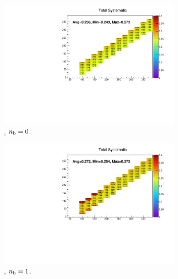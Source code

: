 \begin{figure}[h!]
  \centering
  \begin{subfigure}[b]{0.47\textwidth}
    \includegraphics[width=\textwidth]{Figs/sms/t2degen/v19/systs/total_T2_4body_eq0b_le3j_incl.pdf}
    \caption{\njlow, $n_{\text{b}} = 0$.}
  \end{subfigure}
  \begin{subfigure}[b]{0.47\textwidth}
    \includegraphics[width=\textwidth]{Figs/sms/t2degen/v19/systs/total_T2_4body_eq1b_le3j_incl.pdf}
    \caption{\njlow, $n_{\text{b}} = 1$.}
  \end{subfigure}\\
  \begin{subfigure}[b]{0.47\textwidth}

\end{subfigure}
\end{figure}
